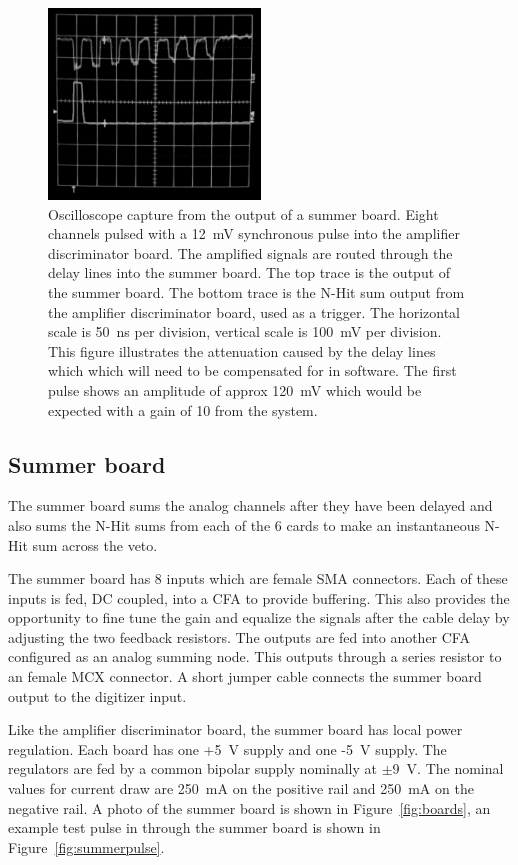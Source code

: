 \documentclass[review,number,sort&compress]{elsarticle}
\begin{document}
\begin{figure}[ht]
\begin{center}
	\includegraphics[height=2in, keepaspectratio=true]{graphics/delaypulse_bw.jpg}
	\caption{Oscilloscope capture from the output of a summer board. Eight channels
		pulsed with a 12~mV synchronous pulse into the amplifier discriminator board. The amplified
		signals are routed through the delay lines into the summer board. The top trace is
		the output of the summer board. The bottom trace is the N-Hit sum output from the
		amplifier discriminator board, used as a trigger. The horizontal scale is 50~ns per division,
		vertical scale is 100~mV per division. This figure illustrates the attenuation caused by the delay
		lines which which will need to be compensated for in software. The first pulse shows an amplitude of approx 120~mV which would be expected with a gain of 10 from the system.
\label{fig:multipulse}}
\end{center}
\end{figure}

\subsection{Summer board}
\label{sec:Sum}
%
The summer board sums the analog channels after they have been delayed
and also sums the N-Hit sums from each of the 6 cards to make an
instantaneous N-Hit sum across the veto. 

The summer board has 8 inputs which are female SMA connectors. Each of
these inputs is fed, DC coupled, into a CFA to provide buffering. This
also provides the opportunity to fine tune the gain and equalize the
signals after the cable delay by adjusting the two feedback resistors.
The outputs are fed into another CFA configured as an analog summing
node. This outputs through a series resistor to an female MCX
connector. A short jumper cable connects the summer board output to
the digitizer input.  

Like the amplifier discriminator board, the summer board has local
power regulation.  Each board has one +5~V supply and one -5~V supply.
The regulators are fed by a common bipolar supply nominally at
$\pm$9~V.  The nominal values for current draw are 250~mA on the
positive rail and 250~mA on the negative rail.  A photo of the summer
board is shown in Figure~\ref{fig:boards}, an example test pulse in
through the summer board is shown in Figure~\ref{fig:summerpulse}.
\end{document}
